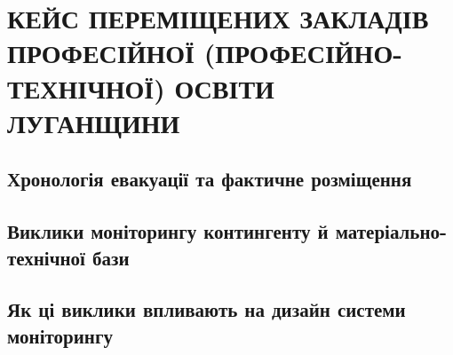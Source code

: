 
\section{\MakeUppercase{Кейс переміщених закладів професійної (професійно-технічної) освіти Луганщини}}
\label{sec:displaced}

\subsection{Хронологія евакуації та фактичне розміщення}
\label{sec:displaced-history}


\subsection{Виклики моніторингу контингенту й матеріально-технічної бази}
\label{sec:displaced-monitoring}


\subsection{Як ці виклики впливають на дизайн системи моніторингу}
\label{sec:displaced-design-impact}

